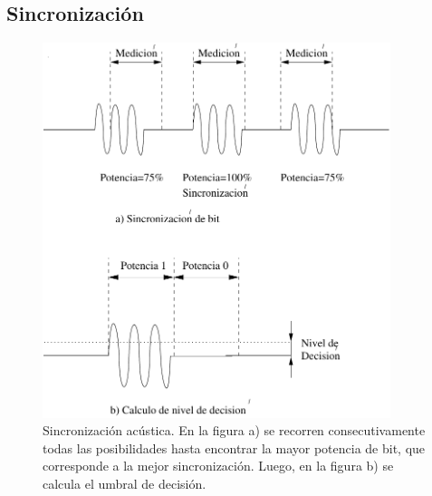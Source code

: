 \subsection{Sincronización}

\begin{figure}[t]
  \centering
    \includegraphics[width=4in]{graphs/acusync.pdf}
\caption {Sincronización acústica. En la figura a) se recorren consecutivamente todas las posibilidades hasta encontrar la mayor potencia de bit, que corresponde a la mejor sincronización. Luego, en la figura b) se calcula el umbral de decisión.}
\label{fig:acusync}
\end{figure}

